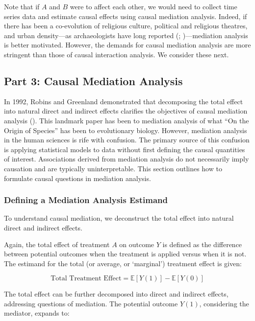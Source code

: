 \documentclass[
  single column]{article}
\begin{document}
Note that if \(A\) and \(B\) were to affect each other, we would need to
collect time series data and estimate causal effects using causal
mediation analysis. Indeed, if there has been a co-evolution of
religious culture, political and religious theatres, and urban
density---as archaeologists have long reported
(;
)---mediation analysis is
better motivated. However, the demands for causal mediation analysis are
more stringent than those of causal interaction analysis. We consider
these next.

\subsection{Part 3: Causal Mediation Analysis}\label{id-sec-3}

In 1992, Robins and Greenland demonstrated that decomposing the total
effect into natural direct and indirect effects clarifies the objectives
of causal mediation analysis (). This landmark paper has been to mediation analysis of
what ``On the Origin of Species'' has been to evolutionary biology.
However, mediation analysis in the human sciences is rife with
confusion. The primary source of this confusion is applying statistical
models to data without first defining the causal quantities of interest.
Associations derived from mediation analysis do not necessarily imply
causation and are typically uninterpretable. This section outlines how
to formulate causal questions in mediation analysis.

\subsubsection{Defining a Mediation Analysis
Estimand}\label{defining-a-mediation-analysis-estimand}

To understand causal mediation, we deconstruct the total effect into
natural direct and indirect effects.

Again, the total effect of treatment \(A\) on outcome \(Y\) is defined
as the difference between potential outcomes when the treatment is
applied versus when it is not. The estimand for the total (or average,
or `marginal') treatment effect is given:

\[
\text{Total Treatment Effect} = \mathbb{E}[Y(1)] - \mathbb{E}[Y(0)]
\]

The total effect can be further decomposed into direct and indirect
effects, addressing questions of mediation. The potential outcome
\(Y(1)\), considering the mediator, expands to:
\end{document}
